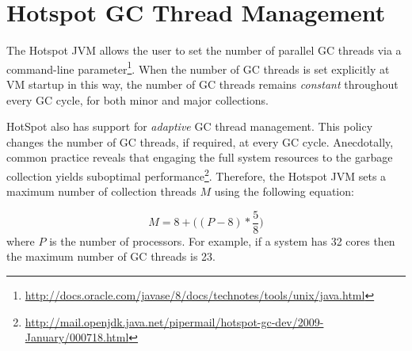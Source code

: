 \section{Hotspot GC Thread Management}

The Hotspot JVM allows the user to set the number of parallel GC threads
via a command-line parameter\footnote{\url{http://docs.oracle.com/javase/8/docs/technotes/tools/unix/java.html}}.
When the number of GC threads is set explicitly at VM startup in this way,
the number of GC threads remains \emph{constant} throughout every GC cycle, 
for both minor and major collections.

HotSpot also has support for \emph{adaptive} GC thread management.
This policy changes the number of GC threads, if required, at every GC cycle.
Anecdotally, common practice reveals that engaging the full system resources to the garbage collection yields suboptimal performance\footnote{
\url{http://mail.openjdk.java.net/pipermail/hotspot-gc-dev/2009-January/000718.html}}.
Therefore, the Hotspot JVM sets a maximum number of collection threads $M$ using the following equation:

\begin{equation}
M = 8 + \big((P-8) * \frac{5}{8}\big)
\end{equation}
where $P$ is the number of processors.
For example, if a system has 32 cores then the maximum number of GC threads is 23.